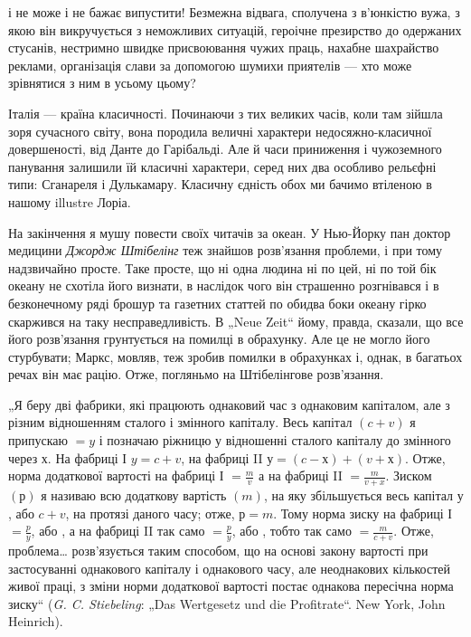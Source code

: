 \parcont{}  %
і не може і не бажає випустити! Безмежна відвага, сполучена
з в’юнкістю вужа, з якою він викручується з неможливих ситуацій,
героічне презирство до одержаних стусанів, нестримно швидке
присвоювання чужих праць, нахабне шахрайство реклами, організація
слави за допомогою шумихи приятелів — хто може зрівнятися
з ним в усьому цьому?

Італія — країна класичності. Починаючи з тих великих часів,
коли там зійшла зоря сучасного світу, вона породила величні
характери недосяжно-класичної довершеності, від Данте до
Гарібальді. Але й часи приниження і чужоземного панування
залишили їй класичні характери, серед них два особливо рельєфні
типи: Сганареля і Дулькамару. Класичну єдність обох ми
бачимо втіленою в нашому illustre Лоріа.

На закінчення я мушу повести своїх читачів за океан. У Нью-Йорку
пан доктор медицини \emph{Джордж Штібелінг} теж знайшов
розв’язання проблеми, і при тому надзвичайно просте. Таке
просте, що ні одна людина ні по цей, ні по той бік океану не
схотіла його визнати, в наслідок чого він страшенно розгнівався
і в безконечному ряді брошур та газетних статтей по обидва
боки океану гірко скаржився на таку несправедливість. В „Neue
Zeit“ йому, правда, сказали, що все його розв’язання грунтується
на помилці в обрахунку. Але це не могло його стурбувати;
Маркс, мовляв, теж зробив помилки в обрахунках і, однак,
в багатьох речах він має рацію. Отже, погляньмо на Штібелінгове
розв’язання.

„Я беру дві фабрики, які працюють однаковий час з однаковим
капіталом, але з різним відношенням сталого і змінного
капіталу. Весь капітал $(c + v)$ я припускаю $= y$ і позначаю ріжницю
у відношенні сталого капіталу до змінного через $х$. На
фабриці І $y = c + v$, на фабриці II $у = (c - х) + (v + х)$. Отже,
норма додаткової вартості на фабриці І $= \frac{m}{v}$ а на фабриці II $=
\frac{m}{v+x}$. Зиском $(р)$ я називаю всю додаткову вартість $(m)$, на
яку збільшується весь капітал $у$, або $c + v$, на протязі даного
часу; отже, $р = m$. Тому норма зиску на фабриці І $= \frac{p}{y}$, або
, а на фабриці II так само $= \frac{p}{y}$, або , тобто
так само $= \frac{m}{c + v}$. Отже, проблема\dots{} розв’язується таким способом,
що на основі закону вартості при застосуванні однакового
капіталу і однакового часу, але неоднакових кількостей
живої праці, з зміни норми додаткової вартості постає однакова
пересічна норма зиску“ (\emph{G. C. Stiebeling}: „Das Wertgesetz und die
Profitrate“. New York, John Heinrich).

